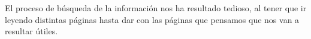 El proceso de búsqueda de la información nos ha resultado tedioso, al tener que ir leyendo distintas páginas hasta dar con las páginas que pensamos que nos van a resultar útiles.







% 
    
    
